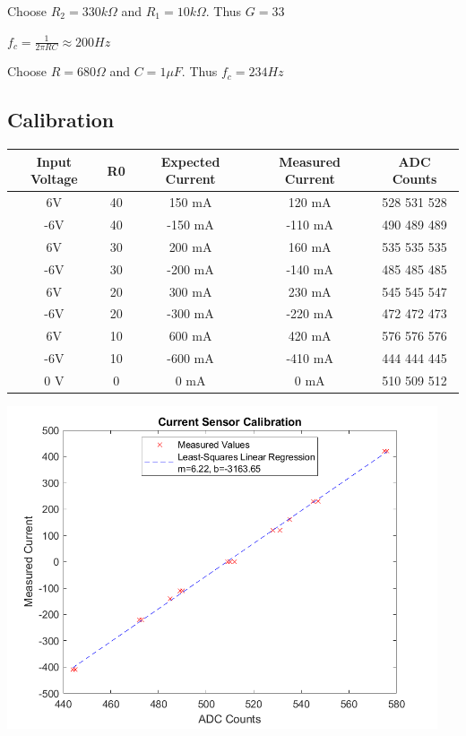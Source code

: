 \documentclass[12pt]{article}
\begin{document}
Choose $R_2 = 330 k\Omega$ and $R_1 = 10 k\Omega$.
Thus $G = 33$

$f_c = \frac{1}{2 \pi RC} \approx 200 Hz$

Choose $R = 680 \Omega$ and $C = 1 \mu F$.
Thus $f_c = 234 Hz$


\subsection*{Calibration}
\begin{center}
\begin{tabular}{|c|c|c|c|c|}
    \hline
    Input Voltage & R0 & Expected Current & Measured Current & ADC Counts \\
    \hline
    6V & 40 & 150 mA & 120 mA & 528 531 528 \\
    \hline
    -6V & 40 & -150 mA & -110 mA & 490 489 489\\
    \hline
    6V & 30 & 200 mA & 160 mA & 535 535 535 \\
    \hline
    -6V & 30 & -200 mA & -140 mA & 485 485 485 \\
    \hline
    6V & 20 & 300 mA & 230 mA & 545 545 547 \\
    \hline
    -6V & 20 & -300 mA & -220 mA & 472 472 473 \\
    \hline
    6V & 10 & 600 mA & 420 mA & 576 576 576 \\
    \hline
    -6V & 10 & -600 mA & -410 mA & 444 444 445 \\
    \hline
    0 V & 0 & 0 mA & 0 mA & 510 509 512 \\
    \hline
\end{tabular}
\end{center}

\begin{center}
    \includegraphics[width=5in]{current_sensor_calibration_curve.png}
\end{center}
\end{document}
